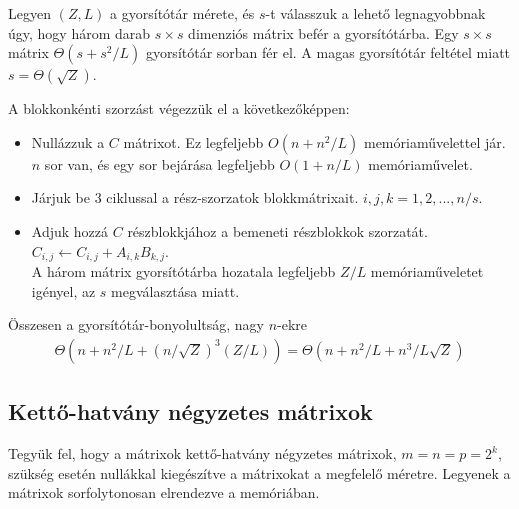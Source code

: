 \documentclass[12pt]{report}
\begin{document}
Legyen $(Z, L)$ a gyorsítótár mérete,
és $s$-t válasszuk a lehető legnagyobbnak úgy,
hogy három darab $s \times s$ dimenziós mátrix befér a gyorsítótárba.
Egy $s \times s$ mátrix $\Theta(s+s^2/L)$ gyorsítótár sorban fér el.
A magas gyorsítótár feltétel miatt $s=\Theta(\sqrt{Z})$.

A blokkonkénti szorzást végezzük el a következőképpen:
\begin{itemize}
\item Nullázzuk a $C$ mátrixot.
Ez legfeljebb $O(n+n^2/L)$ memóriaművelettel jár.
$n$ sor van, és egy sor bejárása legfeljebb $O(1+n/L)$ memóriaművelet.
\item Járjuk be 3 ciklussal a rész-szorzatok blokkmátrixait. $i, j, k = 1, 2, ..., n/s$.
\item Adjuk hozzá $C$ részblokkjához a bemeneti részblokkok szorzatát. \\
$C_{i,j} \leftarrow C_{i,j} + A_{i,k} B_{k,j}$. \\
A három mátrix gyorsítótárba hozatala legfeljebb $Z/L$ memóriaműveletet igényel,
az $s$ megválasztása miatt.
\end{itemize}
Összesen a gyorsítótár-bonyolultság\cite{prokop}, nagy $n$-ekre
\begin{align*}
\Theta(n+n^2/L+(n/\sqrt{Z})^3(Z/L)) = \Theta(n+n^2/L+n^3/L\sqrt{Z})
\end{align*}

\subsection{Kettő-hatvány négyzetes mátrixok}

Tegyük fel, hogy a mátrixok kettő-hatvány négyzetes mátrixok,
$m=n=p=2^k$,
szükség esetén nullákkal kiegészítve a mátrixokat a megfelelő méretre.
Legyenek a mátrixok sorfolytonosan elrendezve a memóriában.
\end{document}
